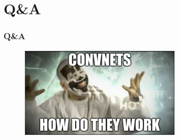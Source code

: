 \documentclass{beamer}
\begin{document}
\section*{Q\&A}

\begin{frame}
  \frametitle{Q\&A}
  \begin{figure}
    \centering
    \includegraphics[width=0.7\textwidth]{convnet_how_to_work.png}
  \end{figure}
\end{frame}
\end{document}
